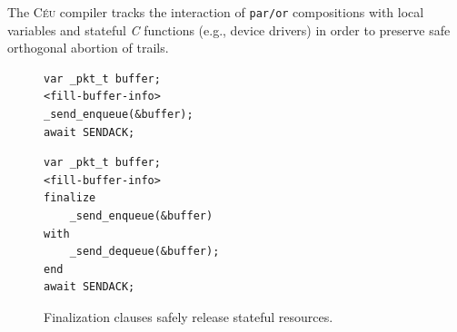 \documentclass[preprint]{sigplanconf}
\newcommand{\CEU}{\textsc{C\'{e}u}\xspace}
\newcommand{\code}[1] {{\small{\texttt{#1}}}}
\newcommand{\1}{\;}
\newcommand{\2}{\;\;}
\newcommand{\3}{\;\;\;}
\newcommand{\5}{\;\;\;\;\;}
\begin{document}
%
The \CEU compiler tracks the interaction of \code{par/or} compositions with 
local variables and stateful \emph{C} functions (e.g., device drivers) in order 
to preserve safe orthogonal abortion of trails.
%

\begin{figure}%
\begin{minipage}[t]{0.45\linewidth}
\begin{lstlisting}
var _pkt_t buffer;
<fill-buffer-info>
_send_enqueue(&buffer);
await SENDACK;
\end{lstlisting}
\end{minipage}
%
\begin{minipage}[t]{0.50\linewidth}
\begin{lstlisting}
var _pkt_t buffer;
<fill-buffer-info>
finalize
    _send_enqueue(&buffer)
with
    _send_dequeue(&buffer);
end
await SENDACK;
\end{lstlisting}
\end{minipage}
\caption{ Finalization clauses safely release stateful resources.
\label{lst.fin}
}
\end{figure}
\end{document}
